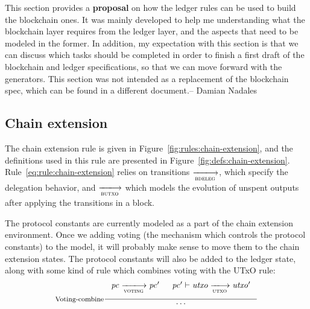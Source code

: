 \begin{note}
  This section provides a \textbf{proposal} on how the ledger rules can be used
  to build the blockchain ones. It was mainly developed to help me
  understanding what the blockchain layer requires from the ledger layer, and
  the aspects that need to be modeled in the former. In addition, my
  expectation with this section is that we can discuss which tasks should be
  completed in order to finish a first draft of the blockchain and ledger
  specifications, so that we can move forward with the generators. This section
  was not intended as a replacement of the blockchain spec, which can be found
  in a different document.-- Damian Nadales
\end{note}

\subsection{Chain extension}
\label{sec:chain-extension}

The chain extension rule is given in Figure~\ref{fig:rules:chain-extension},
and the definitions used in this rule are presented in
Figure~\ref{fig:defs:chain-extension}. Rule~\ref{eq:rule:chain-extension}
relies on transitions $\trans{bdeleg}{}$, which specify the delegation
behavior, and $\trans{butxo}{}$ which models the evolution of unspent outputs
after applying the transitions in a block. 

\begin{note}
  The protocol constants are currently modeled as a part of the
  chain extension environment. Once we adding voting
  (the mechanism which controls the protocol constants)
  to the model, it will probably make sense to move them to the
  chain extension states. The protocol constants will also be
  added to the ledger state, along with some kind of rule which
  combines voting with the UTxO rule:
  \begin{equation*}
    \inference[Voting-combine]
    {
      \var{pc} \trans{voting}{} \var{pc'} &
      \var{pc'} \vdash \var{utxo} \trans{utxo}{} \var{utxo'}\\ ~ \\
    }
    {\ldots}
  \end{equation*}
\end{note}

